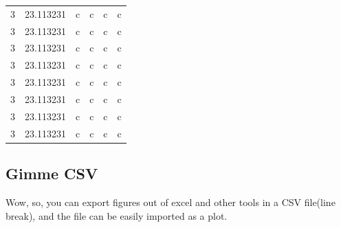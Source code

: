 \documentclass{article}
\begin{document}
\begin{table}
\begin{center}
\begin{tabular}{l|S|r|r|r|r}
            3                & 23.113231        & c                & c          & c          & c          \\
            3                & 23.113231        & c                & c          & c          & c          \\
            3                & 23.113231        & c                & c          & c          & c          \\
            3                & 23.113231        & c                & c          & c          & c          \\
            3                & 23.113231        & c                & c          & c          & c          \\
            3                & 23.113231        & c                & c          & c          & c          \\
            3                & 23.113231        & c                & c          & c          & c          \\
            3                & 23.113231        & c                & c          & c          & c          \\
            \bottomrule
        \end{tabular}
    \end{center}
\end{table}

\newpage
\subsection{Gimme CSV}
Wow, so, you can export figures out of excel and other tools in a CSV file(line break), and the file can be easily imported as a plot.
\end{document}
